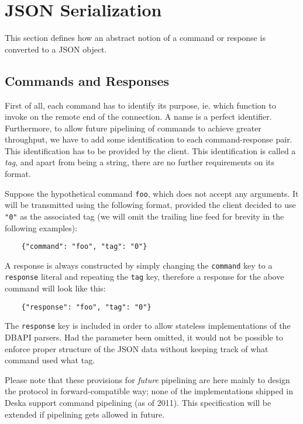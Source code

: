 \documentclass{article}
\begin{document}
\section{JSON Serialization}

This section defines how an abstract notion of a command or response is converted to a JSON object.

\subsection{Commands and Responses}

First of all, each command has to identify its purpose, ie. which function to invoke on the remote end of the
connection.  A name is a perfect identifier.  Furthermore, to allow future pipelining of commands to achieve greater
throughput, we have to add some identification to each command-response pair.  This identification has to be provided by
the client.  This identification is called a {\em tag}, and apart from being a string, there are no further
requirements on its format.

Suppose the hypothetical command {\tt foo}, which does not accept any arguments.  It will be transmitted using the
following format, provided the client decided to use {\tt "0"} as the associated tag (we will omit the trailing line
feed for brevity in the following examples):

\begin{lstlisting}
    {"command": "foo", "tag": "0"}
\end{lstlisting}

A response is always constructed by simply changing the {\tt command} key to a {\tt response} literal and repeating the
{\tt tag} key, therefore a response for the above command will look like this:

\begin{lstlisting}
    {"response": "foo", "tag": "0"}
\end{lstlisting}

The {\tt response} key is included in order to allow stateless implementations of the DBAPI parsers.  Had the parameter
been omitted, it would not be possible to enforce proper structure of the JSON data without keeping track of what
command used what tag.

Please note that these provisions for {\em future} pipelining are here mainly to design the protocol in
forward-compatible way; none of the implementations shipped in Deska support command pipelining (as of 2011).  This
specification will be extended if pipelining gets allowed in future.
\end{document}
